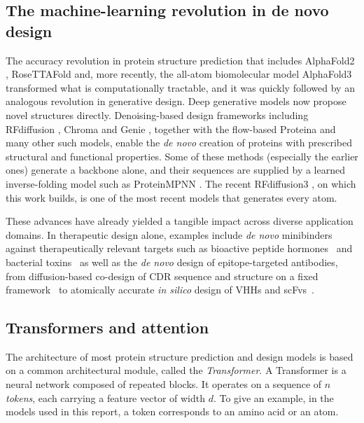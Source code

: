 \subsection{The machine-learning revolution in de novo design}
\label{subsec:ml-design}

The accuracy revolution in protein structure prediction that includes AlphaFold2
\parencite{jumperHighlyAccurateProtein2021}, RoseTTAFold
\parencite{baekAccuratePredictionProtein2021} and, more recently, the all-atom
biomolecular model AlphaFold3 \parencite{abramsonAccurateStructurePrediction2024} 
transformed what is computationally tractable, and it was quickly followed by an
analogous revolution in generative design. Deep generative models now 
propose novel structures directly. Denoising-based
design frameworks including RFdiffusion \parencite{watsonNovoDesignProtein2023},
Chroma \parencite{ingrahamIlluminatingProteinSpace2023} and Genie
\parencite{lin_generating_2023,lin_out_2024,linFastUltraCapableProtein2026},
together with the flow-based Proteina \parencite{geffner_proteina_2025} and many other
such models, enable the \emph{de novo} creation of proteins with prescribed structural and functional
properties. Some of these methods (especially the earlier ones) generate a backbone
alone, and their sequences are supplied by a
learned inverse-folding model such as ProteinMPNN
\parencite{dauparasRobustDeepLearning2022}. The recent RFdiffusion3 
\parencite{butcher_novo_2025}, on which this work builds, is one of the most recent models that generates every atom.

These advances have already yielded a tangible impact across diverse application domains.
In therapeutic design alone, examples include \emph{de novo} minibinders against therapeutically relevant targets such as bioactive peptide hormones~\parencite{vazquez_torres_novo_2024} 
and bacterial toxins~\parencite{ragotte_novo_2025} as well as the \emph{de novo} design of 
epitope-targeted antibodies, from diffusion-based co-design of CDR sequence and structure on a fixed
framework~\parencite{luo_antigen-specific_2022} to atomically accurate
\emph{in silico} design of VHHs and scFvs~\parencite{bennett_atomically_2026}.


\subsection{Transformers and attention}
\label{subsec:transformers}

The architecture of most protein structure prediction and design models is based on 
a common architectural module, called the \emph{Transformer}. A Transformer 
\parencite{vaswaniAttentionAllYou2017} is a neural network composed of
repeated blocks. It operates on a sequence of $n$ \emph{tokens}, each carrying a
feature vector of width $d$. To give an example, in the models used in this
report, a token corresponds to an amino acid or an atom.

